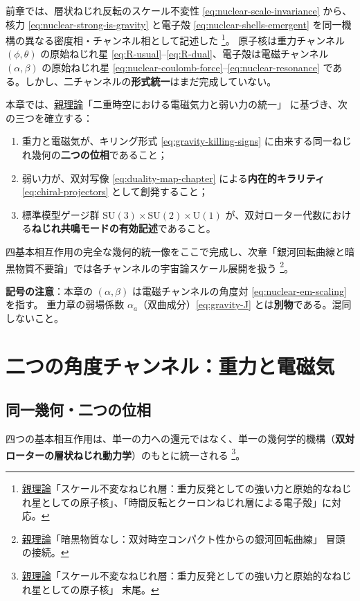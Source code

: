 \documentclass[dvipdfmx,a4paper,oneside]{jsbook}
\numberwithin{equation}{chapter}
\begin{document}
前章では、層状ねじれ反転のスケール不変性 \eqref{eq:nuclear-scale-invariance} から、核力 \eqref{eq:nuclear-strong-is-gravity} と電子殻 \eqref{eq:nuclear-shells-emergent} を同一機構の異なる密度相・チャンネル相として記述した \footnote{\hyperref[sec:sister-manuscripts]{親理論}「スケール不変なねじれ層：重力反発としての強い力と原始的なねじれ星としての原子核」、「時間反転とクーロンねじれ層による電子殻」に対応。}。
原子核は重力チャンネル \((\phi, \theta)\) の原始ねじれ星 \eqref{eq:R-usual}–\eqref{eq:R-dual}、電子殻は電磁チャンネル \((\alpha, \beta)\) の原始ねじれ星 \eqref{eq:nuclear-coulomb-force}–\eqref{eq:nuclear-resonance} である。しかし、二チャンネルの\textbf{形式統一}はまだ完成していない。

本章では、\hyperref[sec:sister-manuscripts]{親理論}「二重時空における電磁気力と弱い力の統一」 に基づき、次の三つを確立する：
\begin{enumerate}[leftmargin=2em]
  \item 重力と電磁気が、キリング形式 \eqref{eq:gravity-killing-signs} に由来する同一ねじれ幾何の\textbf{二つの位相}であること；
  \item 弱い力が、双対写像 \eqref{eq:duality-map-chapter} による\textbf{内在的キラリティ} \eqref{eq:chiral-projectors} として創発すること；
  \item 標準模型ゲージ群 \(\mathrm{SU}(3)\times\mathrm{SU}(2)\times\mathrm{U}(1)\) が、双対ローター代数における\textbf{ねじれ共鳴モードの有効記述}であること。
\end{enumerate}
四基本相互作用の完全な幾何的統一像をここで完成し、次章「銀河回転曲線と暗黒物質不要論」では各チャンネルの宇宙論スケール展開を扱う \footnote{\hyperref[sec:sister-manuscripts]{親理論}「暗黒物質なし：双対時空コンパクト性からの銀河回転曲線」 冒頭の接続。}。

\textbf{記号の注意}：本章の \((\alpha, \beta)\) は電磁チャンネルの角度対 \eqref{eq:nuclear-em-scaling} を指す。
重力章の弱場係数 \(\alpha_a\)（双曲成分）\eqref{eq:gravity-J} とは\textbf{別物}である。混同しないこと。

\section{二つの角度チャンネル：重力と電磁気}

\subsection{同一幾何・二つの位相}

四つの基本相互作用は、単一の力への還元ではなく、単一の幾何学的機構（\textbf{双対ローターの層状ねじれ動力学}）のもとに統一される \footnote{\hyperref[sec:sister-manuscripts]{親理論}「スケール不変なねじれ層：重力反発としての強い力と原始的なねじれ星としての原子核」 末尾。}。
\end{document}
